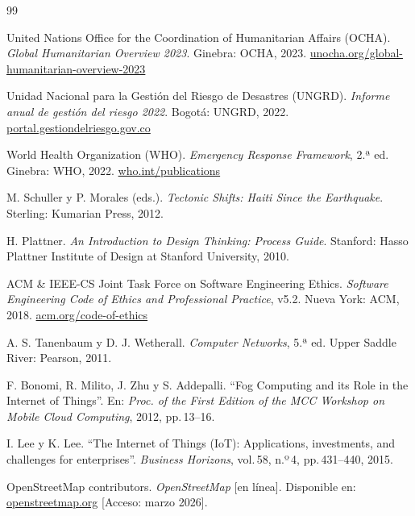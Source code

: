 \documentclass[12pt,a4paper]{article}
\begin{document}
\begin{thebibliography}{99}

United Nations Office for the Coordination of Humanitarian Affairs (OCHA).
\textit{Global Humanitarian Overview 2023}.
Ginebra: OCHA, 2023.
\href{https://www.unocha.org/global-humanitarian-overview-2023}{unocha.org/global-humanitarian-overview-2023}

Unidad Nacional para la Gestión del Riesgo de Desastres (UNGRD).
\textit{Informe anual de gestión del riesgo 2022}.
Bogotá: UNGRD, 2022.
\href{https://portal.gestiondelriesgo.gov.co}{portal.gestiondelriesgo.gov.co}

World Health Organization (WHO).
\textit{Emergency Response Framework}, 2.ª ed.
Ginebra: WHO, 2022.
\href{https://www.who.int/publications/i/item/9789240058460}{who.int/publications}

M. Schuller y P. Morales (eds.).
\textit{Tectonic Shifts: Haiti Since the Earthquake}.
Sterling: Kumarian Press, 2012.

H. Plattner.
\textit{An Introduction to Design Thinking: Process Guide}.
Stanford: Hasso Plattner Institute of Design at Stanford University, 2010.

ACM \& IEEE-CS Joint Task Force on Software Engineering Ethics.
\textit{Software Engineering Code of Ethics and Professional Practice}, v5.2.
Nueva York: ACM, 2018.
\href{https://www.acm.org/code-of-ethics}{acm.org/code-of-ethics}

A. S. Tanenbaum y D. J. Wetherall.
\textit{Computer Networks}, 5.ª ed.
Upper Saddle River: Pearson, 2011.

F. Bonomi, R. Milito, J. Zhu y S. Addepalli.
``Fog Computing and its Role in the Internet of Things''.
En: \textit{Proc. of the First Edition of the MCC Workshop on Mobile Cloud Computing}, 2012, pp.\,13--16.

I. Lee y K. Lee.
``The Internet of Things (IoT): Applications, investments, and challenges for enterprises''.
\textit{Business Horizons}, vol.\,58, n.º\,4, pp.\,431--440, 2015.

OpenStreetMap contributors.
\textit{OpenStreetMap} [en línea].
Disponible en: \href{https://www.openstreetmap.org}{openstreetmap.org}
[Acceso: marzo 2026].

\end{thebibliography}
\end{document}
